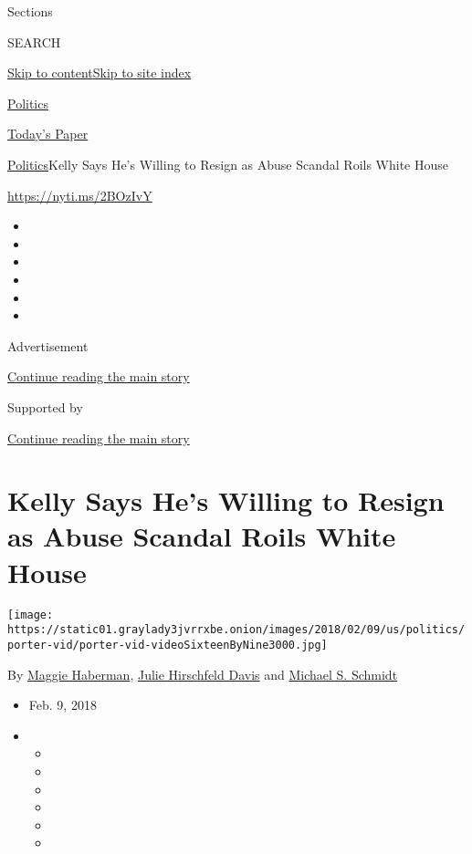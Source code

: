 Sections

SEARCH

\protect\hyperlink{site-content}{Skip to
content}\protect\hyperlink{site-index}{Skip to site index}

\href{https://www.nytimes3xbfgragh.onion/section/politics}{Politics}

\href{https://myaccount.nytimes3xbfgragh.onion/auth/login?response_type=cookie\&client_id=vi}{}

\href{https://www.nytimes3xbfgragh.onion/section/todayspaper}{Today's
Paper}

\href{/section/politics}{Politics}\textbar{}Kelly Says He's Willing to
Resign as Abuse Scandal Roils White House

\url{https://nyti.ms/2BOzIvY}

\begin{itemize}
\item
\item
\item
\item
\item
\item
\end{itemize}

Advertisement

\protect\hyperlink{after-top}{Continue reading the main story}

Supported by

\protect\hyperlink{after-sponsor}{Continue reading the main story}

\hypertarget{kelly-says-hes-willing-to-resign-as-abuse-scandal-roils-white-house}{%
\section{Kelly Says He's Willing to Resign as Abuse Scandal Roils White
House}\label{kelly-says-hes-willing-to-resign-as-abuse-scandal-roils-white-house}}

\texttt{[image: https://static01.graylady3jvrrxbe.onion/images/2018/02/09/us/politics/porter-vid/porter-vid-videoSixteenByNine3000.jpg]}

By \href{http://www.nytimes3xbfgragh.onion/by/maggie-haberman}{Maggie
Haberman},
\href{https://www.nytimes3xbfgragh.onion/by/julie-hirschfeld-davis}{Julie
Hirschfeld Davis} and
\href{http://www.nytimes3xbfgragh.onion/by/michael-s-schmidt}{Michael S.
Schmidt}

\begin{itemize}
\item
  Feb. 9, 2018
\item
  \begin{itemize}
  \item
  \item
  \item
  \item
  \item
  \item
  \end{itemize}
\end{itemize}

